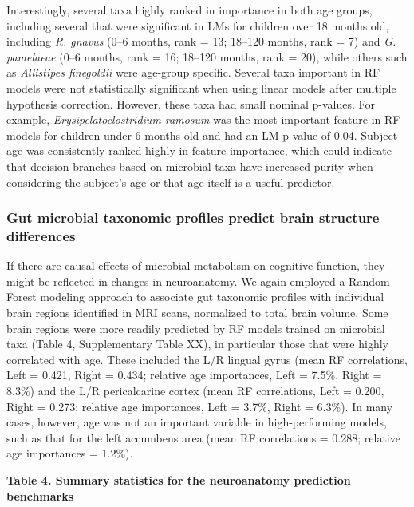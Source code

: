 \documentclass[
]{article}
\begin{document}
Interestingly, several taxa highly ranked in importance in both age
groups, including several that were significant in LMs for children over
18 months old, including \emph{R. gnavus} (0--6 months, rank = 13;
18--120 months, rank = 7) and \emph{G. pamelaeae} (0--6 months, rank =
16; 18--120 months, rank = 20), while others such as \emph{Allistipes
finegoldii} were age-group specific. Several taxa important in RF models
were not statistically significant when using linear models after
multiple hypothesis correction. However, these taxa had small nominal
p-values. For example, \emph{Erysipelatoclostridium ramosum} was the
most important feature in RF models for children under 6 months old and
had an LM p-value of 0.04. Subject age was consistently ranked highly in
feature importance, which could indicate that decision branches based on
microbial taxa have increased purity when considering the subject's age
or that age itself is a useful predictor.

\hypertarget{gut-microbial-taxonomic-profiles-predict-brain-structure-differences}{%
\subsubsection{Gut microbial taxonomic profiles predict brain structure
differences}\label{gut-microbial-taxonomic-profiles-predict-brain-structure-differences}}

If there are causal effects of microbial metabolism on cognitive
function, they might be reflected in changes in neuroanatomy. We again
employed a Random Forest modeling approach to associate gut taxonomic
profiles with individual brain regions identified in MRI scans,
normalized to total brain volume. Some brain regions were more readily
predicted by RF models trained on microbial taxa (Table 4, Supplementary
Table XX), in particular those that were highly correlated with age.
These included the L/R lingual gyrus (mean RF correlations, Left =
0.421, Right = 0.434; relative age importances, Left = 7.5\%, Right =
8.3\%) and the L/R pericalcarine cortex (mean RF correlations, Left =
0.200, Right = 0.273; relative age importances, Left = 3.7\%, Right =
6.3\%). In many cases, however, age was not an important variable in
high-performing models, such as that for the left accumbens area (mean
RF correlations = 0.288; relative age importances = 1.2\%).

\textbf{Table 4. Summary statistics for the neuroanatomy prediction
benchmarks}
\end{document}
